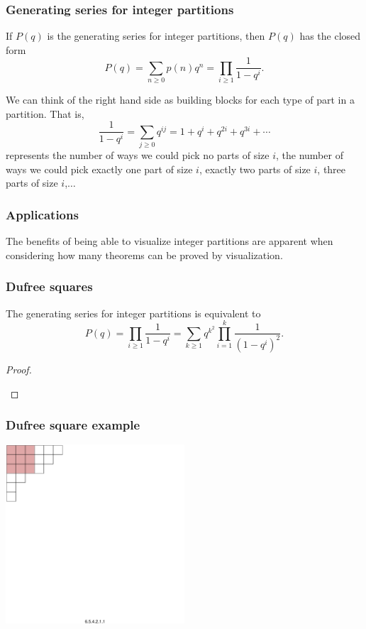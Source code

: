 \documentclass{beamer}
\begin{document}
\begin{frame}
\frametitle{Generating series for integer partitions}

If $P(q)$ is the generating series for integer partitions, then $P(q)$ has the closed form
$$P(q) = \sum_{n\geq0}p(n)q^n = \prod_{i\geq 1}\frac{1}{1-q^i}.$$


We can think of the right hand side as building blocks for each type of part in a partition. That is,
$$\frac{1}{1-q^i} = \sum_{j \geq 0}q^{ij} = 1 + q^i + q^{2i} +q^{3i} +\dotsb $$
represents the number of ways we could pick no parts of size $i$, the number of ways we could pick exactly one part of size $i$, exactly two parts of size $i$, three parts of size $i$,$\ldots$
\end{frame}

\begin{frame}
  \frametitle{Applications}
  The benefits of being able to visualize integer partitions are apparent when considering how many theorems can be proved by visualization.
\end{frame}

\begin{frame}
	\frametitle{Dufree squares}
\begin{theorem}
The generating series for integer partitions is equivalent to
$$P(q) = \prod_{i\geq 1} \frac{1}{1-q^i} = \sum_{k\geq1}q^{k^2}\prod_{i=1}^{k}\frac{1}{(1-q^i)^2}.$$	
\end{theorem}

\begin{proof}
\begin{center}
\end{center}
\end{proof}
\end{frame}

\begin{frame}
\frametitle{Dufree square example}
\centering
\includegraphics[width=0.5\textwidth]{LargestSquare}	
\end{frame}
\end{document}
